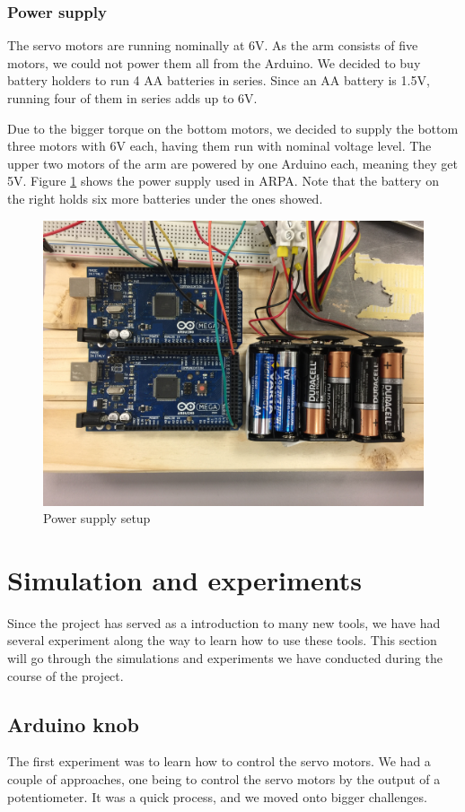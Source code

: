 \documentclass[11pt,a4paper, titlepage]{article}
\begin{document}
	\subsubsection{Power supply}
	The servo motors are running nominally at 6V. As the arm consists of five motors, we could not power them all from the Arduino. We decided to buy battery holders to run 4 AA batteries in series. Since an AA battery is 1.5V, running four of them in series adds up to 6V.
	
	Due to the bigger torque on the bottom motors, we decided to supply the bottom three motors with 6V each,  having them run with nominal voltage level. The upper two motors of the arm are powered by one Arduino each, meaning they get 5V. Figure \ref{fig:power} shows the power supply used in ARPA. Note that the battery on the right holds six more batteries under the ones showed.
	
	\begin{figure}[H]
		\centering
		\includegraphics[width=0.8\linewidth]{../Diagrams/PowerSupply.jpg}
		\caption{Power supply setup}
		\label{fig:power}
	\end{figure}
	
		
	\section{Simulation and experiments}
	\label{simex}
	Since the project has served as a introduction to many new tools, we have had several experiment along the way to learn how to use these tools. This section will go through the simulations and experiments we have conducted during the course of the project.
	
	\subsection{Arduino knob}
	The first experiment was to learn how to control the servo motors. We had a couple of approaches, one being to control the servo motors by the output of a potentiometer. It was a quick process, and we moved onto bigger challenges.
	
\end{document}
